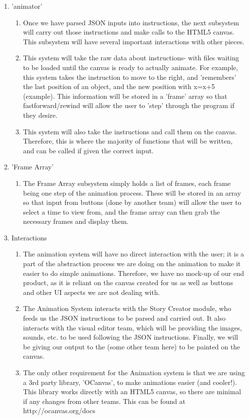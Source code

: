 \documentclass[12pt]{article}
\begin{document}
\begin{enumerate}
\begin{enumerate}
\end{enumerate}
\item 'animator'
\begin{enumerate}
\item Once we have parsed JSON inputs into instructions, the next subsystem will carry out those instructions and make calls to the HTML5 canvas. This subsystem will have several important interactions with other pieces.
\item This system will take the raw data about instructions- with files waiting to be loaded until the canvas is ready to actually animate. For example, this system takes the instruction to move to the right, and 'remembers' the last position of an object, and the new position with x=x+5 (example). This information will be stored in a 'frame' array so that fastforward/rewind will allow the user to 'step' through the program if they desire.
\item This system will also take the instructions and call them on the canvas. Therefore, this is where the majority of functions that will be written, and can be called if given the correct input.
\end{enumerate}

\item 'Frame Array'
\begin{enumerate}
\item The Frame Array subsystem simply holds a list of frames, each frame being one step of the animation process. These will be stored in an array so that input from buttons (done by another team) will allow the user to select a time to view from, and the frame array can then grab the necessary frames and display them. 
\end{enumerate}

\item Interactions
\begin{enumerate}
\item The animation system will have no direct interaction with the user; it is a part of the abstraction process we are doing on the animation to make it easier to do simple animations. Therefore, we have no mock-up of our end product, as it is reliant on the canvas created for us as well as buttons and other UI aspects we are not dealing with.
\item The Animation System interacts with the Story Creator module, who feeds us the JSON instructions to be parsed and carried out. It also interacts with the visual editor team, which will be providing the images, sounds, etc. to be used following the JSON instructions. Finally, we will be giving our output to the (some other team here) to be painted on the canvas.
\item The only other requirement for the Animation system is that we are using a 3rd party library, 'OCanvas', to make animations easier (and cooler!). This library works directly with an HTML5 canvas, so there are minimal if any changes from other teams. This can be found at http://ocanvas.org/docs

\end{enumerate}



  \end{enumerate}

	
\end{document}
